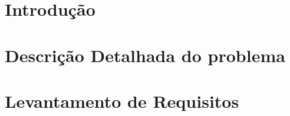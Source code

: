 \documentclass[11pt]{article}
\begin{document}


\newpage{}
\tableofcontents{}
\newpage{}

\section{Introdução}


\section{Descrição Detalhada do problema}


\section{Levantamento de Requisitos}

\end{document}
